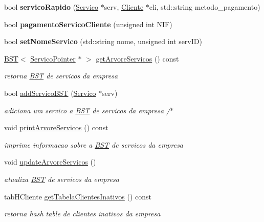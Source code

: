 \begin{DoxyCompactItemize}
bool {\bfseries servico\+Rapido} (\hyperlink{class_servico}{Servico} $\ast$serv, \hyperlink{class_cliente}{Cliente} $\ast$cli, std\+::string metodo\+\_\+pagamento)
\item 
\mbox{\label{class_empresa_a1ea3f3759f3377ba18c974b21254c8e6}} 
bool {\bfseries pagamento\+Servico\+Cliente} (unsigned int N\+IF)
\item 
\mbox{\label{class_empresa_a27262bddd41ff48b0585e05ef600e9fe}} 
bool {\bfseries set\+Nome\+Servico} (std\+::string nome, unsigned int serv\+ID)
\item 
\hyperlink{class_b_s_t}{B\+ST}$<$ \hyperlink{class_servico_pointer}{Servico\+Pointer} $\ast$ $>$ \hyperlink{class_empresa_a1515dc722b64eab75b9d7a37ddd7863b}{get\+Arvore\+Servicos} () const
\begin{DoxyCompactList}\small\item\em retorna \hyperlink{class_b_s_t}{B\+ST} de servicos da empresa \end{DoxyCompactList}\item 
bool \hyperlink{class_empresa_a7f40b739ea88afe971c3a52d520d708a}{add\+Servico\+B\+ST} (\hyperlink{class_servico}{Servico} $\ast$serv)
\begin{DoxyCompactList}\small\item\em adiciona um servico a \hyperlink{class_b_s_t}{B\+ST} de servicos da empresa /$\ast$ \end{DoxyCompactList}\item 
void \hyperlink{class_empresa_a7e760a09feabb76e7ab0b121be61be4a}{print\+Arvore\+Servicos} () const
\begin{DoxyCompactList}\small\item\em imprime informacao sobre a \hyperlink{class_b_s_t}{B\+ST} de servicos da empresa \end{DoxyCompactList}\item 
void \hyperlink{class_empresa_a218427b819a92be11e5f1c808dcd3153}{update\+Arvore\+Servicos} ()
\begin{DoxyCompactList}\small\item\em atualiza \hyperlink{class_b_s_t}{B\+ST} de servicos da empresa \end{DoxyCompactList}\item 
tab\+H\+Cliente \hyperlink{class_empresa_aeb8ed69f2ec85275de6372e18a8945db}{get\+Tabela\+Clientes\+Inativos} () const
\begin{DoxyCompactList}\small\item\em retorna hash table de clientes inativos da empresa \end{DoxyCompactList}\item 

\end{DoxyCompactItemize}
